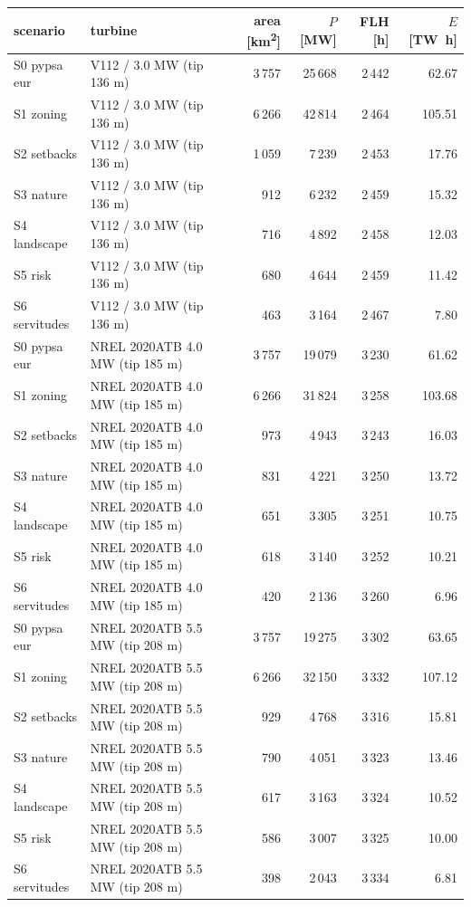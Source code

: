 \begin{tabular}{llrrrr}
\toprule
scenario & turbine & area [\si{\square\kilo\metre}] & $P$ [\si{\mega\watt}] & FLH [\si{\hour}] & $E$ [\si{\tera\watt\hour}] \\
\midrule
S0 pypsa eur & V112 / 3.0 MW (tip 136 m) & 3\,757 & 25\,668 & 2\,442 & 62.67 \\
S1 zoning & V112 / 3.0 MW (tip 136 m) & 6\,266 & 42\,814 & 2\,464 & 105.51 \\
S2 setbacks & V112 / 3.0 MW (tip 136 m) & 1\,059 & 7\,239 & 2\,453 & 17.76 \\
S3 nature & V112 / 3.0 MW (tip 136 m) & 912 & 6\,232 & 2\,459 & 15.32 \\
S4 landscape & V112 / 3.0 MW (tip 136 m) & 716 & 4\,892 & 2\,458 & 12.03 \\
S5 risk & V112 / 3.0 MW (tip 136 m) & 680 & 4\,644 & 2\,459 & 11.42 \\
S6 servitudes & V112 / 3.0 MW (tip 136 m) & 463 & 3\,164 & 2\,467 & 7.80 \\
S0 pypsa eur & NREL 2020ATB 4.0 MW (tip 185 m) & 3\,757 & 19\,079 & 3\,230 & 61.62 \\
S1 zoning & NREL 2020ATB 4.0 MW (tip 185 m) & 6\,266 & 31\,824 & 3\,258 & 103.68 \\
S2 setbacks & NREL 2020ATB 4.0 MW (tip 185 m) & 973 & 4\,943 & 3\,243 & 16.03 \\
S3 nature & NREL 2020ATB 4.0 MW (tip 185 m) & 831 & 4\,221 & 3\,250 & 13.72 \\
S4 landscape & NREL 2020ATB 4.0 MW (tip 185 m) & 651 & 3\,305 & 3\,251 & 10.75 \\
S5 risk & NREL 2020ATB 4.0 MW (tip 185 m) & 618 & 3\,140 & 3\,252 & 10.21 \\
S6 servitudes & NREL 2020ATB 4.0 MW (tip 185 m) & 420 & 2\,136 & 3\,260 & 6.96 \\
S0 pypsa eur & NREL 2020ATB 5.5 MW (tip 208 m) & 3\,757 & 19\,275 & 3\,302 & 63.65 \\
S1 zoning & NREL 2020ATB 5.5 MW (tip 208 m) & 6\,266 & 32\,150 & 3\,332 & 107.12 \\
S2 setbacks & NREL 2020ATB 5.5 MW (tip 208 m) & 929 & 4\,768 & 3\,316 & 15.81 \\
S3 nature & NREL 2020ATB 5.5 MW (tip 208 m) & 790 & 4\,051 & 3\,323 & 13.46 \\
S4 landscape & NREL 2020ATB 5.5 MW (tip 208 m) & 617 & 3\,163 & 3\,324 & 10.52 \\
S5 risk & NREL 2020ATB 5.5 MW (tip 208 m) & 586 & 3\,007 & 3\,325 & 10.00 \\
S6 servitudes & NREL 2020ATB 5.5 MW (tip 208 m) & 398 & 2\,043 & 3\,334 & 6.81 \\
\bottomrule
\end{tabular}